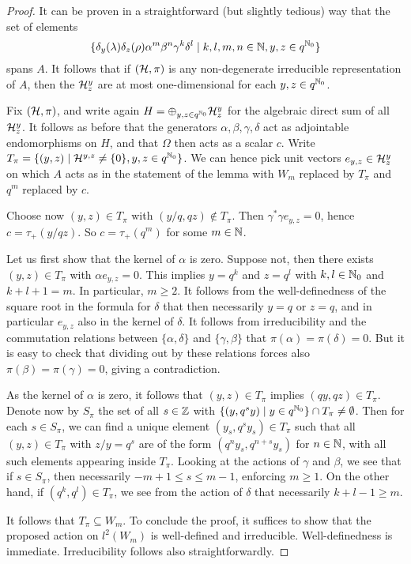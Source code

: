 \begin{proof}%
It can be proven in a straightforward (but slightly tedious) way that the set of elements \[\{\delta_{y}(\lambda)\delta_{z}(\rho)\alpha^m\beta^n\gamma^k\delta^l\mid k,l,m,n\in \mathbb{N},y,z\in q^{\mathbb{N}_0}\}\] spans $A$. It follows that if $(\mathcal{H},\pi)$ is any non-degenerate irreducible representation of $A$, then the $\mathcal{H}^y_z$ are at most one-dimensional for each $y,z\in q^{\mathbb{N}_0}$. 

Fix $(\mathcal{H},\pi)$, and write again $H = \oplus_{y,z\in q^{\mathbb{N}_0}} \mathcal{H}^y_z$ for the algebraic direct sum of all $\mathcal{H}^y_z$. It follows as before that the generators $\alpha,\beta,\gamma,\delta$ act as adjointable endomorphisms on $H$, and that $\Omega$ then acts as a scalar $c$. Write $T_{\pi} =\{(y,z)\mid \mathcal{H}^{y,z}\neq \{0\}, y,z\in q^{\mathbb{N}_0}\}$. We can hence pick unit vectors $e_{y,z}\in \mathcal{H}^y_z$ on which $A$ acts as in the statement of the lemma with $W_m$ replaced by $T_{\pi}$ and $q^m$ replaced by $c$.

Choose now $(y,z)\in T_{\pi}$ with $(y/q,qz)\notin T_{\pi}$. Then $\gamma^*\gamma e_{y,z} = 0$, hence $c=\tau_+(y/qz)$. So $c= \tau_+(q^m)$ for some $m\in \mathbb{N}$.

Let us first show that the kernel of $\alpha$ is zero. Suppose not, then there exists $(y,z)\in T_{\pi}$ with $\alpha e_{y,z}=0$. This implies $y= q^k$ and $z=q^l$ with $k,l\in \mathbb{N}_0$ and $k+l+1 = m$. In particular, $m\geq 2$. It follows from the well-definedness of the square root in the formula for $\delta$ that then necessarily $y=q$ or $z=q$, and in particular $e_{y,z}$ also in the kernel of $\delta$. It follows from irreducibility and the commutation relations between $\{\alpha,\delta\}$ and $\{\gamma,\beta\}$ that $\pi(\alpha) = \pi(\delta)=0$. But it is easy to check that dividing out by these relations forces also $\pi(\beta)=\pi(\gamma)=0$, giving a contradiction. 

As the kernel of $\alpha$ is zero, it follows that $(y,z)\in T_{\pi}$ implies $(qy,qz)\in T_{\pi}$. Denote now by $S_{\pi}$ the set of all $s\in \mathbb{Z}$ with $\{(y,q^sy)\mid y\in q^{\mathbb{N}_0}\}\cap T_{\pi}\neq \emptyset$. Then for each $s\in S_{\pi}$, we can find a unique element $(y_s,q^sy_s) \in T_{\pi}$ such that all $(y,z)\in T_{\pi}$ with $z/y= q^s$ are of the form $(q^ny_s,q^{n+s}y_s)$ for $n\in \mathbb{N}$, with all such elements appearing inside $T_{\pi}$. Looking at the actions of $\gamma$ and $\beta$, we see that if $s\in S_{\pi}$, then necessarily $-m+1\leq s\leq m-1$, enforcing $m\geq 1$. On the other hand, if $(q^k,q^l)\in T_{\pi}$, we see from the action of $\delta$ that necessarily $k+l-1\geq m$. 

It follows that $T_{\pi} \subseteq W_m$. To conclude the proof, it suffices to show that the proposed action on $l^2(W_m)$ is well-defined and irreducible. Well-definedness is immediate. Irreducibility follows also straightforwardly.
\end{proof}


